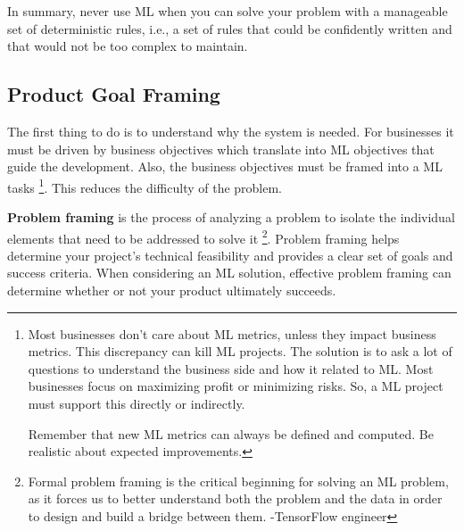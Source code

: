 In summary, never use ML when you can solve your problem with a
manageable set of deterministic rules, i.e., a set of rules that
could be confidently written and that would not be too complex to
maintain.



\subsection*{Product Goal Framing}
The first thing to do is to understand why the system is needed.
For businesses it must be driven by business objectives which
translate into ML objectives that guide the development. Also, 
the business objectives must be framed into a ML tasks
\footnote{
    Most businesses don't care about ML metrics, 
    unless they impact business metrics. This discrepancy can kill
    ML projects. The solution is to ask a lot of questions to
    understand the business side and how it related to ML. Most 
    businesses focus on maximizing profit or minimizing risks. So,
    a ML project must support this directly or indirectly.

    Remember that new ML metrics can always be defined and computed.
    Be realistic about expected improvements.
}.
This reduces the difficulty of the problem.

\textbf{Problem framing} is the process of analyzing a problem to isolate
the individual elements that need to be addressed to solve it
\footnote{
    Formal problem framing is the critical beginning for solving
    an ML problem, as it forces us to better understand both the
    problem and the data in order to design and build a bridge
    between them. -TensorFlow engineer
}.
Problem framing helps determine your project's technical
feasibility and provides a clear set of goals and success
criteria. When considering an ML solution, effective problem
framing can determine whether or not your product ultimately
succeeds.

